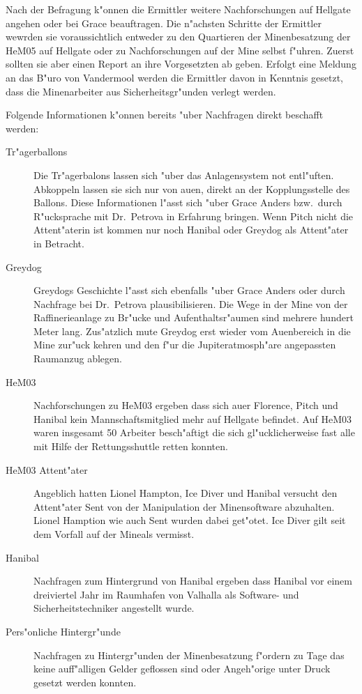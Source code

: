 Nach der Befragung k"onnen die Ermittler weitere Nachforschungen auf Hellgate angehen oder bei Grace beauftragen. Die n"achsten Schritte der Ermittler wewrden sie voraussichtlich entweder zu den Quartieren der Minenbesatzung der HeM05 auf Hellgate oder zu Nachforschungen auf der Mine selbst f"uhren. Zuerst sollten sie aber einen Report an ihre Vorgesetzten ab geben. Erfolgt eine Meldung an das B"uro von Vandermool werden die Ermittler davon in Kenntnis gesetzt, dass die Minenarbeiter aus Sicherheitsgr"unden verlegt werden.


Folgende Informationen k"onnen bereits "uber Nachfragen direkt beschafft werden:

\begin{description}
	\item[Tr"agerballons] Die Tr"agerbalons lassen sich "uber das Anlagensystem not entl"uften. Abkoppeln lassen sie sich nur von au\3en, 
		direkt an der Kopplungsstelle des Ballons. Diese Informationen l"asst sich "uber Grace Anders bzw.~durch R"ucksprache mit Dr.~Petrova in Erfahrung bringen. Wenn Pitch nicht die Attent"aterin ist kommen nur noch Hanibal oder Greydog als Attent"ater in Betracht.
	\item[Greydog] Greydogs Geschichte l"asst sich ebenfalls "uber Grace Anders oder durch Nachfrage bei Dr.~Petrova plausibilisieren. Die 
		Wege in der Mine von der Raffinerieanlage zu Br"ucke und Aufenthaltsr"aumen sind mehrere hundert Meter lang. Zus"atzlich mu\3te Greydog erst wieder vom Au\3enbereich in die Mine zur"uck kehren und den f"ur die Jupiteratmosph"are angepassten Raumanzug ablegen.
	\item[HeM03] Nachforschungen zu HeM03 ergeben dass sich au\3er Florence, Pitch und Hanibal kein Mannschaftsmitglied mehr auf Hellgate befindet. Auf HeM03 waren insgesamt 50 Arbeiter besch"aftigt die sich gl"ucklicherweise fast alle mit Hilfe der Rettungsshuttle retten konnten. 
	\item[HeM03 Attent"ater] Angeblich hatten Lionel Hampton, Ice Diver und Hanibal versucht den Attent"ater Sent von der Manipulation der 
		Minensoftware abzuhalten. Lionel Hamption wie auch Sent wurden dabei get"otet. Ice Diver gilt seit dem Vorfall auf der Mineals vermisst.
	\item[Hanibal] Nachfragen zum Hintergrund von Hanibal ergeben dass Hanibal vor einem dreiviertel Jahr im Raumhafen von Valhalla als 
		Software- und Sicherheitstechniker angestellt wurde.
	\item[Pers"onliche Hintergr"unde] Nachfragen zu Hintergr"unden der Minenbesatzung f"ordern zu Tage das keine auff"alligen Gelder 
		geflossen sind oder Angeh"orige unter Druck gesetzt werden konnten.
\end{description}

